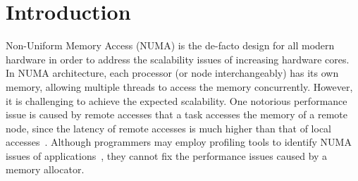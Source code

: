 
\section{Introduction}
\label{sec:intro}

Non-Uniform Memory Access (NUMA) is the de-facto design for all modern hardware in order to address the scalability issues of increasing hardware cores. 
In NUMA architecture, each processor (or node interchangeably) has its own memory, allowing multiple threads to access the memory concurrently. However, it is challenging to achieve the expected scalability. One notorious performance issue is caused by remote accesses that a task accesses the memory of a remote node,  since the latency of remote accesses is much higher than that of local accesses~\cite{Blagodurov:2011:CNC:2002181.2002182}. 
Although programmers may employ profiling tools to identify NUMA issues of applications~\cite{Intel:VTune, Memphis, Lachaize:2012:MMP:2342821.2342826, XuNuma, NumaMMA, 7847070, NumaPerf}, they cannot fix the performance issues caused by a memory allocator.

